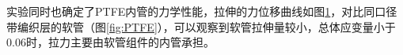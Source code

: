 \begin{figure}[!htb]
\centering
{}
\hspace{0.5cm}
\label{fig:PTFE-traction}
\end{figure}


实验同时也确定了PTFE内管的力学性能，拉伸的力位移曲线如图\ref{fig:PTFE-traction}，对比同口径带编织层的软管（图\ref{fig:PTFE}），可以观察到软管拉伸量较小，总体应变量小于0.06时，拉力主要由软管组件的内管承担。



